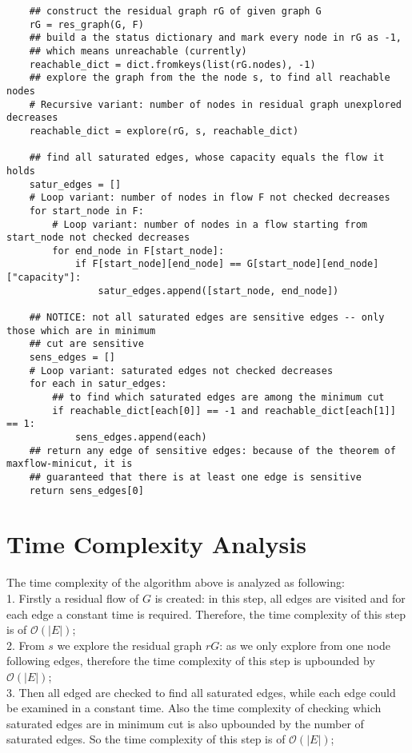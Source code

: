 \documentclass[a4paper,11pt]{article}
\begin{document}
\begin{lstlisting}
    ## construct the residual graph rG of given graph G
    rG = res_graph(G, F)
    ## build a the status dictionary and mark every node in rG as -1,
    ## which means unreachable (currently)
    reachable_dict = dict.fromkeys(list(rG.nodes), -1)
    ## explore the graph from the the node s, to find all reachable nodes
    # Recursive variant: number of nodes in residual graph unexplored decreases
    reachable_dict = explore(rG, s, reachable_dict)

    ## find all saturated edges, whose capacity equals the flow it holds
    satur_edges = []
    # Loop variant: number of nodes in flow F not checked decreases
    for start_node in F:
        # Loop variant: number of nodes in a flow starting from start_node not checked decreases
        for end_node in F[start_node]:
            if F[start_node][end_node] == G[start_node][end_node]["capacity"]:
                satur_edges.append([start_node, end_node])

    ## NOTICE: not all saturated edges are sensitive edges -- only those which are in minimum
    ## cut are sensitive
    sens_edges = []
    # Loop variant: saturated edges not checked decreases
    for each in satur_edges:
        ## to find which saturated edges are among the minimum cut
        if reachable_dict[each[0]] == -1 and reachable_dict[each[1]] == 1:
            sens_edges.append(each)
    ## return any edge of sensitive edges: because of the theorem of maxflow-minicut, it is
    ## guaranteed that there is at least one edge is sensitive
    return sens_edges[0]

\end{lstlisting}

\section{Time Complexity Analysis}
The time complexity of the algorithm above is analyzed as following: \\
1. Firstly a residual flow of $G$ is created: in this step, all edges are visited and for each edge a constant time is required. Therefore, the time complexity of this step is of $\mathcal{O}(|E|)$; \\

2. From $s$ we explore the residual graph $rG$: as we only explore from one node following edges, therefore the time complexity of this step is upbounded by $\mathcal{O}(|E|)$; \\

3. Then all edged are checked to find all saturated edges, while each edge could be examined in a constant time. Also the time complexity of checking which saturated edges are in minimum cut is also upbounded by the number of saturated edges. So the time complexity of this step is of $\mathcal{O}(|E|)$; \\
\end{document}

